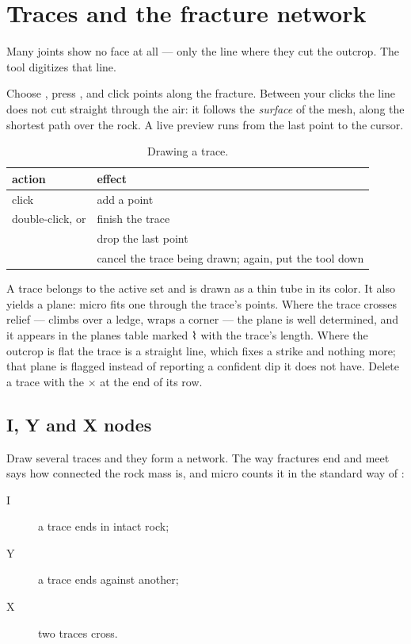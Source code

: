 \section{Traces and the fracture network}\label{sec:structure-traces}

Many joints show no face at all — only the line where they cut the outcrop. The  tool digitizes that line.

Choose , press , and click points along the fracture. Between your clicks the line does not cut straight through the air: it follows the \emph{surface} of the mesh, along the shortest path over the rock. A live preview runs from the last point to the cursor.

\begin{table}[htbp]\small
\begin{tabularx}{\linewidth}{@{}lL@{}}\toprule
action & effect \\ \midrule
click & add a point \\
double-click, or  & finish the trace \\
 & drop the last point \\
 & cancel the trace being drawn; again, put the tool down \\ \bottomrule
\end{tabularx}
\caption{Drawing a trace.}\label{tab:structure-trace-keys}
\end{table}

A trace belongs to the active set and is drawn as a thin tube in its color. It also yields a plane: micro fits one through the trace's points. Where the trace crosses relief — climbs over a ledge, wraps a corner — the plane is well determined, and it appears in the planes table marked ⌇ with the trace's length. Where the outcrop is flat the trace is a straight line, which fixes a strike and nothing more; that plane is flagged  instead of reporting a confident dip it does not have. Delete a trace with the × at the end of its row.

\subsection{I, Y and X nodes}

Draw several traces and they form a network. The way fractures end and meet says how connected the rock mass is, and micro counts it in the standard way of \textcite{sanderson2015}:

\begin{description}
\item[I] a trace ends in intact rock;
\item[Y] a trace ends against another;
\item[X] two traces cross.
\end{description}

